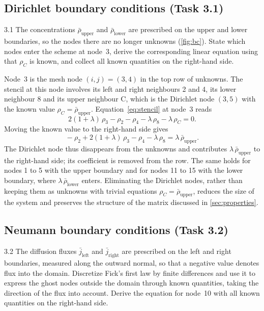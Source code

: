 \documentclass[11pt,a4paper]{article}
\numberwithin{equation}{section}
\theoremstyle{definition}
\theoremstyle{remark}
\newcommand{\rhoUpper}{\bar{\rho}_{\mathrm{upper}}}
\newcommand{\rhoLower}{\bar{\rho}_{\mathrm{lower}}}
\newcommand{\jleft}{\bar{j}_{\mathrm{left}}}
\newcommand{\jright}{\bar{j}_{\mathrm{right}}}
\begin{document}
\subsection{Dirichlet boundary conditions (Task 3.1)}\label{sec:dirichlet}

\begin{task}{3.1}
  The concentrations $\rhoUpper$ and $\rhoLower$ are prescribed on the upper and lower
  boundaries, so the nodes there are no longer unknowns (\cref{fig:bc}). State which nodes
  enter the scheme at node~3, derive the corresponding linear equation using that
  $\rho_C$ is known, and collect all known quantities on the right-hand side.
\end{task}

Node~3 is the mesh node $(i,j) = (3,4)$ in the top row of unknowns. The stencil at this
node involves its left and right neighbours 2 and 4, its lower neighbour 8 and its upper
neighbour C, which is the Dirichlet node $(3,5)$ with the known value
$\rho_C = \rhoUpper$. Equation~\eqref{eq:stencil} at node~3 reads
\begin{equation}\label{eq:node3-raw}
  2(1 + \lambda)\,\rho_3 - \rho_2 - \rho_4 - \lambda\,\rho_8 - \lambda\,\rho_C = 0.
\end{equation}
Moving the known value to the right-hand side gives
\begin{equation}\label{eq:node3}
  \boxed{\;
    -\rho_2 + 2(1 + \lambda)\,\rho_3 - \rho_4 - \lambda\,\rho_8 = \lambda\,\rhoUpper.
  \;}
\end{equation}
The Dirichlet node thus disappears from the unknowns and contributes $\lambda\,\rhoUpper$
to the right-hand side; its coefficient is removed from the row. The same holds for
nodes 1 to 5 with the upper boundary and for nodes 11 to 15 with the lower boundary,
where $\lambda\,\rhoLower$ enters. Eliminating the Dirichlet nodes, rather than keeping them
as unknowns with trivial equations $\rho_C = \rhoUpper$, reduces the size of the system and
preserves the structure of the matrix discussed in \cref{sec:properties}.

\subsection{Neumann boundary conditions (Task 3.2)}\label{sec:neumann}

\begin{task}{3.2}
  The diffusion fluxes $\jleft$ and $\jright$ are prescribed on the left and right
  boundaries, measured along the outward normal, so that a negative value denotes flux
  into the domain. Discretize Fick's first law by finite differences and use it to express
  the ghost nodes outside the domain through known quantities, taking the direction of the
  flux into account. Derive the equation for node~10 with all known quantities on the
  right-hand side.
\end{task}
\end{document}
